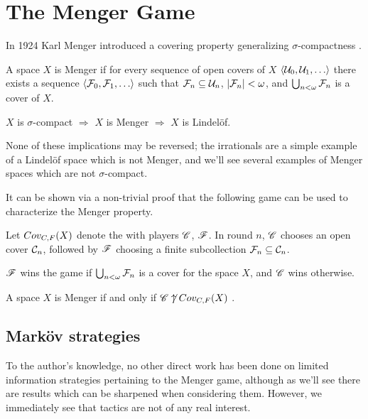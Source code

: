 
\chapter{The Menger Game}

In 1924 Karl Menger introduced a covering property generalizing
$\sigma$-compactness \cite{custom31879423}.

\begin{defn}
  A space $X$ is Menger if for every sequence of open covers of $X$
  $\<\mc U_0,\mc U_1,\dots\>$ there exists a sequence
  $\<\mc F_0,\mc F_1,\dots\>$ such that $\mathcal{F}_n\subseteq \mathcal{U}_n$,
  $|\mathcal{F}_n|<\omega$, and $\bigcup_{n<\omega}\mathcal{F}_n$ is a cover of $X$.
\end{defn}

\begin{prop}
  $X$ is $\sigma$-compact
    $\Rightarrow$
  $X$ is Menger
    $\Rightarrow$
  $X$ is Lindel\"of.
\end{prop}

None of these implications may be reversed; the irrationals are a simple example
of a Lindel\"of space which is not Menger, and we'll see several examples of
Menger spaces which are not $\sigma$-compact.

It can be shown via a non-trivial
proof that the following game can be used to characterize the Menger property.

\begin{game}
  Let $Cov_{C,F}(X)$ denote the  with players $\mathscr{C}$, $\mathscr{F}$.
  In round $n$, $\mathscr{C}$ chooses an open cover $\mathcal{C}_n$, followed by $\mathscr{F}$
  choosing a finite subcollection $\mathcal{F}_n\subseteq \mathcal{C}_n$.

  $\mathscr{F}$ wins the game if $\bigcup_{n<\omega}\mathcal{F}_n$ is a cover for the space
  $X$, and $\mathscr{C}$ wins otherwise.
\end{game}

\begin{thm}
  A space $X$ is Menger if and only if $\mathscr{C}\not\uparrow Cov_{C,F}(X)$
  \cite{MR1544773}.
\end{thm}

\section{Mark\"ov strategies}

To the author's knowledge, no other direct work has been done on limited
information strategies pertaining to the Menger game, although as we'll see
there are results which can be sharpened when considering them.
However, we immediately see that tactics are not of any real interest.

